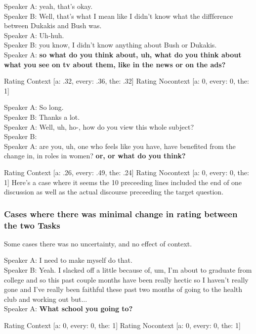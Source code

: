 \documentclass[12pt,letterpaper,table,svgnames,dvipsnames]{article}
\begin{document}
\begin{exe}
    \ex {}
    Speaker A: yeah, that's okay.\\
    Speaker B: Well, that's what I mean like I didn't know what the diffference between Dukakis and Bush was.\\
    Speaker A: Uh-huh.\\
    Speaker B: you know, I didn't know anything about Bush or Dukakis.\\
    Speaker A: \textbf{so what do you think about, uh, what do you think about what you see on tv about them, like in the news or on the ads?}
\end{exe}
Rating Context [a: .32, every: .36, the: .32]
Rating Nocontext [a: 0, every: 0, the: 1]

\begin{exe}
    \ex {}
    Speaker A: So long.\\
    Speaker B: Thanks a lot. \\
    Speaker A: Well, uh, ho-, how do you view this whole subject?\\
    Speaker B: \\
    Speaker A: are you, uh, one who feels like you have, have benefited from the change in, in roles in women? \textbf{or, or what do you think?}
\end{exe}
Rating Context [a: .26, every: .49, the: .24]
Rating Nocontext [a: 0, every: 0, the: 1]
Here's a case where it seems the 10 preceeding lines included the end of one discussion as well as the actual discourse preceeding the target question.



\subsubsection{Cases where there was minimal change in rating between the two Tasks}


Some cases there was no uncertainty, and no effect of context.
\begin{exe}
    \ex {}
    Speaker A: I need to make myself do that.\\
    Speaker B: Yeah. I slacked off a little because of, um, I'm about to graduate from college and so this past couple months have been really hectic so I haven't really gone and I've really been faithful these past two months of going to the health club and working out but...\\
    Speaker A: \textbf{What school you going to?}\\
\end{exe}
Rating Context [a: 0, every: 0, the: 1]
Rating Nocontext [a: 0, every: 0, the: 1]
\end{document}
